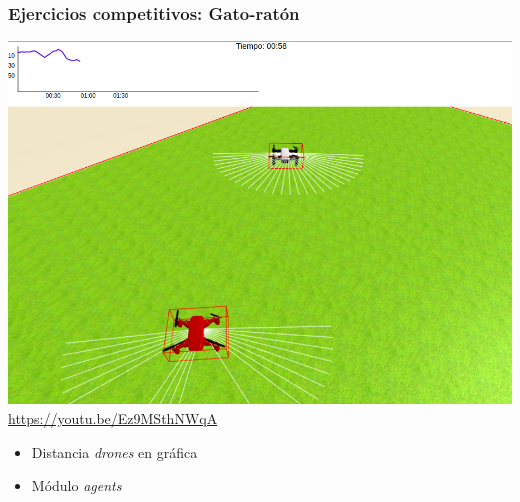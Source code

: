\documentclass[xcolor={table}]{beamer}
\begin{document}
		\begin{frame}
			\frametitle{Ejercicios competitivos: Gato-ratón}

		\begin{minipage}{.48\textwidth}	
	         \href{https://youtu.be/Ez9MSthNWqA}{
            \includegraphics[scale=0.18]{img/evaluador_drone.png}}
            \scriptsize{\url{https://youtu.be/Ez9MSthNWqA}}
        \end{minipage}
        \begin{minipage}{.50\textwidth}
      \begin{itemize}
          \begin{itemize}{}\itemsep5pt
              \item Distancia \textit{drones} en gráfica
              \item Módulo \textit{agents} 
          \end{itemize}
       \end{itemize}
    \end{minipage}
		\end{frame}
		
\end{document}
